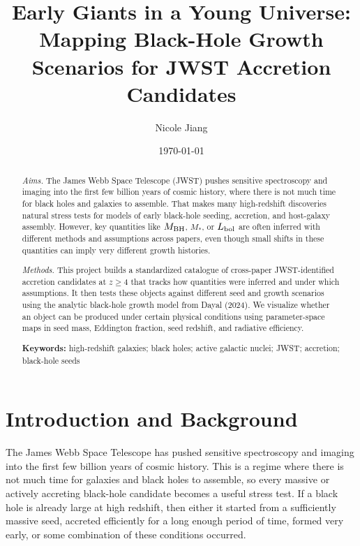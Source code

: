 \documentclass[letterpaper,12pt]{article}
\begin{document}
\title{Early Giants in a Young Universe: Mapping Black-Hole Growth Scenarios for JWST Accretion Candidates}
\author{Nicole Jiang}
\date{\today}
\maketitle

\begin{abstract}
\textit{Aims.} The James Webb Space Telescope (JWST) pushes sensitive spectroscopy and imaging into the first few billion years of cosmic history, where there is not much time for black holes and galaxies to assemble. That makes many high-redshift discoveries natural stress tests for models of early black-hole seeding, accretion, and host-galaxy assembly. However, key quantities like $M_{\rm BH}$, $M_{*}$, or $L_{\rm bol}$ are often inferred with different methods and assumptions across papers, even though small shifts in these quantities can imply very different growth histories.

\textit{Methods.} This project builds a standardized catalogue of cross-paper JWST-identified accretion candidates at $z \geq 4$ that tracks how quantities were inferred and under which assumptions. It then tests these objects against different seed and growth scenarios using the analytic black-hole growth model from Dayal (2024). We visualize whether an object can be produced under certain physical conditions using parameter-space maps in seed mass, Eddington fraction, seed redshift, and radiative efficiency.

\textbf{Keywords:} high-redshift galaxies; black holes; active galactic nuclei; JWST; accretion; black-hole seeds
\end{abstract}

\section{Introduction and Background}

The James Webb Space Telescope has pushed sensitive spectroscopy and imaging into the first few billion years of cosmic history. This is a regime where there is not much time for galaxies and black holes to assemble, so every massive or actively accreting black-hole candidate becomes a useful stress test. If a black hole is already large at high redshift, then either it started from a sufficiently massive seed, accreted efficiently for a long enough period of time, formed very early, or some combination of these conditions occurred.
\end{document}
